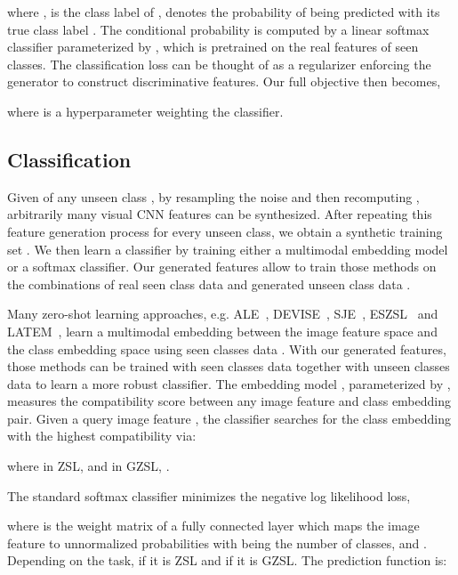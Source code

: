 \documentclass[10pt,twocolumn,letterpaper]{article}
\newcommand{\myparagraph}[1]{\vspace{6pt}\noindent{\bf #1}}
\begin{document}
where ,  is the class label of ,  denotes the probability of  being predicted with its true class label . The conditional probability is computed by a linear softmax classifier parameterized by , which is pretrained on the real features of seen classes. The classification loss can be thought of as a regularizer enforcing the generator to construct discriminative features. 
Our full objective then becomes,

where  is a hyperparameter weighting the classifier. 

\subsection{Classification}
\label{sec:ALE}

Given  of any unseen class , by resampling the noise  and then recomputing , arbitrarily many visual CNN features  can be synthesized. After repeating this feature generation process for every unseen class, we obtain a synthetic training set  . We then learn a classifier by training either a multimodal embedding model or a softmax classifier. Our generated features allow to train those methods on the combinations of real seen class data  and generated unseen class data .


\myparagraph{\texttt{Multimodal Embedding.}} Many zero-shot learning approaches, e.g. ALE~\cite{APHS15}, DEVISE~\cite{FCSBDRM13}, SJE~\cite{ARWLS15}, ESZSL~\cite{RT15} and LATEM~\cite{XASNHS16}, learn a multimodal embedding between the image feature space  and the class embedding space  using seen classes data . 
With our generated features, those methods can be trained with seen classes data  together with unseen classes data  to learn a more robust classifier.
The embedding model , parameterized by , measures the compatibility score between any image feature  and class embedding  pair. Given a query image feature , the classifier searches for the class embedding with the highest compatibility via: 

where in ZSL,  and in GZSL, .





\myparagraph{\texttt{Softmax.}} The standard softmax classifier minimizes the negative log likelihood loss,

where  is the weight matrix of a fully connected layer which maps the image feature  to  unnormalized probabilities with  being the number of classes, and . Depending on the task,  if it is ZSL and  if it is GZSL. The prediction function is:
\end{document}

